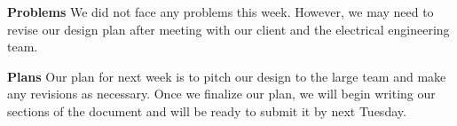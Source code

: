 \documentclass[onecolumn, oneside, letterpaper, draftclsnofoot, 10pt, compsoc]{IEEEtran}
\begin{document}
 \noindent \textbf{Problems}
We did not face any problems this week. However, we may need to revise our design plan after meeting with our client and the electrical engineering team.

\noindent \textbf{Plans}
Our plan for next week is to pitch our design to the large team and make any revisions as necessary. Once we finalize our plan, we will begin writing our sections of the document and will be ready to submit it by next Tuesday.

\end{document}
